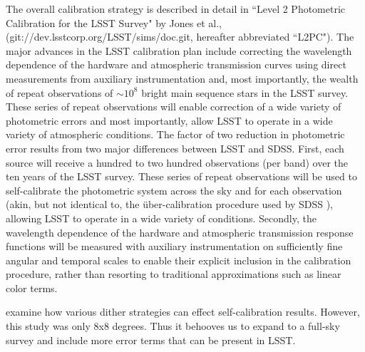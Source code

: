 \documentclass[12pt,preprint]{aastex}
\begin{document}
The overall calibration strategy is described in detail in ``Level 2
Photometric Calibration for the LSST Survey" by Jones et al.,
(git://dev.lsstcorp.org/LSST/sims/doc.git, hereafter abbreviated
``L2PC"). The major advances in the LSST calibration plan include
correcting the wavelength dependence of the hardware and atmospheric
transmission curves using direct measurements from auxiliary
instrumentation and, most importantly, the wealth of repeat
observations of $\sim10^8$ bright main sequence stars in the LSST
survey. These series of repeat observations will enable correction of
a wide variety of photometric errors and most importantly, allow LSST
to operate in a wide variety of atmospheric conditions.  The factor of
two reduction in photometric error results from two major differences
between LSST and SDSS. First, each source will receive a hundred to
two hundred observations (per band) over the ten years of the LSST
survey. These series of repeat observations will be used to
self-calibrate the photometric system across the sky and for each
observation (akin, but not identical to, the \"{u}ber-calibration
procedure used by SDSS \citep{pad08}), allowing LSST to operate in a
wide variety of conditions. Secondly, the wavelength dependence of the
hardware and atmospheric transmission response functions will be
measured with auxiliary instrumentation on sufficiently fine angular
and temporal scales to enable their explicit inclusion in the
calibration procedure, rather than resorting to traditional
approximations such as linear color terms.



\citet{Holmes12} examine how various dither strategies can effect self-calibration results.  However, this study was only 8x8 degrees.  Thus it behooves us to expand to a full-sky survey and include more error terms that can be present in LSST.




\end{document}
